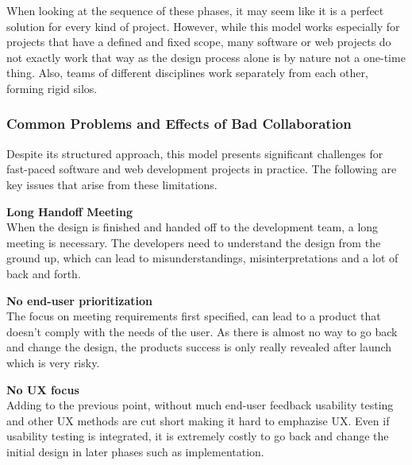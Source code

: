 When looking at the sequence of these phases, it may seem like it is a perfect solution for every kind
of project. However, while this model works especially for projects that have a defined and fixed
scope, many software or web projects do not exactly work that way as the design process alone is by
nature not a one-time thing. Also, teams of different disciplines work separately from each other,
forming rigid silos. 

\subsubsection{Common Problems and Effects of Bad Collaboration}
Despite its structured approach, this model presents significant challenges for fast-paced software
and web development projects in practice. The following are key issues that arise from these
limitations.

\textbf{Long Handoff Meeting} \\
When the design is finished and handed off to the development team, a long meeting is necessary. The
developers need to understand the design from the ground up, which can lead to misunderstandings,
misinterpretations and a lot of back and forth.

\textbf{No end-user prioritization} \\
The focus on meeting requirements first specified, can lead to a product that doesn't comply with
the needs of the user. As there is almost no way to go back and change the design, the products
success is only really revealed after launch which is very risky.

\textbf{No UX focus} \\
Adding to the previous point, without much end-user feedback usability testing and other UX methods
are cut short making it hard to emphazise UX. Even if usability testing is integrated, it is
extremely costly to go back and change the initial design in later phases such as
implementation.

